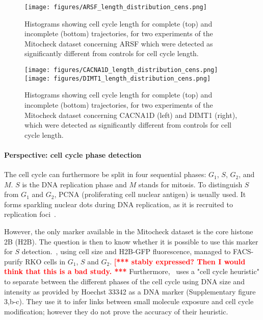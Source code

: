 \begin{figure*}[ht!]
\centerline{\texttt{[image: figures/ARSF\_length\_distribution\_cens.png]}}
\caption{Histograms showing cell cycle length for complete (top) and incomplete (bottom) trajectories, for two experiments of the Mitocheck dataset concerning ARSF which were detected as significantly different from controls for cell cycle length.}
\label{ARSF}
\end{figure*}
\begin{figure*}[ht!]
\centerline{\texttt{[image: figures/CACNA1D\_length\_distribution\_cens.png]}
\texttt{[image: figures/DIMT1\_length\_distribution\_cens.png]}
}
\caption{Histograms showing cell cycle length for complete (top) and incomplete (bottom) trajectories, for two experiments of the Mitocheck dataset concerning CACNA1D (left) and DIMT1 (right), which were detected as significantly different from controls for cell cycle length.}
\label{CAC}
\end{figure*}

\paragraph{Perspective: cell cycle phase detection}
The cell cycle can furthermore be split in four sequential phases: $G_1$, $S$, $G_2$, and $M$. $S$ is the DNA replication phase and $M$ stands for mitosis. To distinguish $S$ from $G_1$ and $G_2$, PCNA (proliferating cell nuclear antigen) is usually used. It forms sparkling nuclear dots during DNA replication, as it is recruited to replication foci~\cite{pmid10769021}.

However, the only marker available in the Mitocheck dataset is the
core histone 2B (H2B). The question is then to know whether it is
possible to use this marker for $S$ detection.~\cite{pmid16765323},
using cell size and H2B-GFP fluorescence, managed to FACS-purify RKO
cells in $G_1$, $S$ and $G_2$. \textcolor{red}{\bf [*** stably
  expressed? Then I would think that this is a bad study. ***}
Furthermore,~\cite{pmid17401369} uses a "cell cycle heuristic" to
 separate between the different phases of the cell cycle using DNA
 size and intensity as provided by Hoechst 33342 as a DNA marker
 (Supplementary figure 3,b-c). They use it to infer links between
 small molecule exposure and cell cycle modification; however they do
 not prove the accuracy of their heuristic. 

